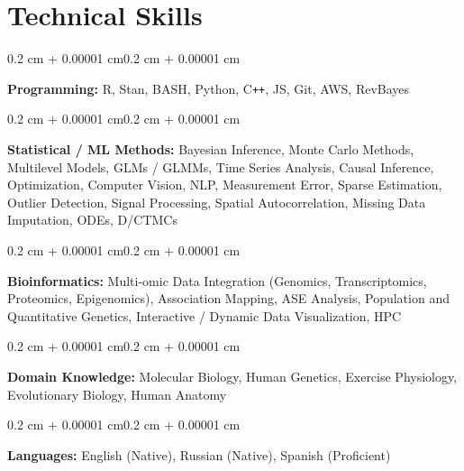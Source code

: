 \documentclass[10pt, letterpaper]{article}
\newenvironment{onecolentry}{
    \begin{adjustwidth}{0.2 cm + 0.00001 cm}{0.2 cm + 0.00001 cm}
}{
    \end{adjustwidth}
}
\begin{document}
    \section{Technical Skills} %
        \begin{onecolentry}
            \textbf{Programming:} R, Stan, BASH, Python, C\texttt{++}, JS, Git, AWS, RevBayes
        \end{onecolentry}
        \vspace{0.15 cm} %
         \begin{onecolentry}
            \textbf{Statistical / ML Methods:} Bayesian Inference, Monte Carlo Methods, Multilevel Models, GLMs / GLMMs, Time Series Analysis, Causal Inference, Optimization, Computer Vision, NLP, Measurement Error, Sparse Estimation, Outlier Detection, Signal Processing, Spatial Autocorrelation, Missing Data Imputation, ODEs, D/CTMCs \end{onecolentry}
         \vspace{0.15 cm}
         \begin{onecolentry}
            \textbf{Bioinformatics:} Multi-omic Data Integration (Genomics, Transcriptomics, Proteomics, Epigenomics), Association Mapping, ASE Analysis, Population and Quantitative Genetics, Interactive / Dynamic Data Visualization, HPC
        \end{onecolentry}
         \vspace{0.15 cm}
         \begin{onecolentry}
            \textbf{Domain Knowledge:} Molecular Biology, Human Genetics, Exercise Physiology, Evolutionary Biology, Human Anatomy
        \end{onecolentry}
        \vspace{0.15 cm}
         \begin{onecolentry}
            \textbf{Languages:} English (Native), Russian (Native), Spanish (Proficient)
        \end{onecolentry}

        
\end{document}
